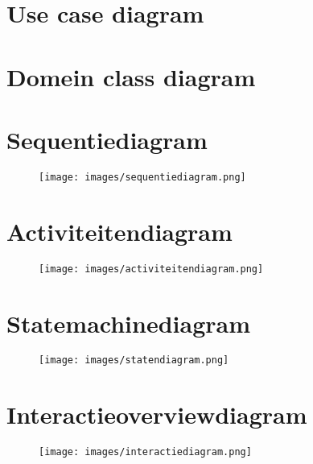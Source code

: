 
\section{Use case diagram}
\label{sec:usecase}

\section{Domein class diagram}
\label{sec:domeinclass}

\newpage

\section{Sequentiediagram}
\label{sec:sequentie}

\begin{figure}[H]
  \centering
  \texttt{[image: images/sequentiediagram.png]}
  \label{figure:sequentiediagram}
\end{figure}

\newpage

\section{Activiteitendiagram}
\label{sec:activiteiten}

\begin{figure}[H]
  \centering
  \texttt{[image: images/activiteitendiagram.png]}
  \label{figure:activiteitendiagram}
\end{figure}

\newpage

\section{Statemachinediagram}
\label{sec:statemachine}

\begin{figure}[H]
  \centering
  \texttt{[image: images/statendiagram.png]}
  \label{figure:statendiagram}
\end{figure}

\newpage

\section{Interactieoverviewdiagram}
\label{sec:interactieoverview}

\begin{figure}[H]
  \centering
  \texttt{[image: images/interactiediagram.png]}
  \label{figure:interactiediagram}
\end{figure}
